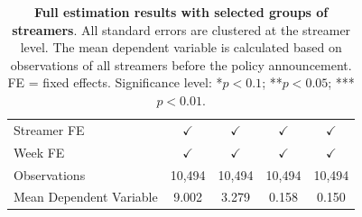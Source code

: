 \documentclass[a4paper,12pt]{article}
\begin{document}
\begin{table}[!htb]
\begin{subtable}{\textwidth}
{\begin{tabular}{lcccc}
Streamer FE & $\checkmark$ & $\checkmark$ & $\checkmark$ & $\checkmark$ \\
Week FE     & $\checkmark$ & $\checkmark$ & $\checkmark$ & $\checkmark$ \\
Observations & 10,494 & 10,494 & 10,494 & 10,494 \\
Mean Dependent Variable & 9.002 & 3.279 & 0.158 & 0.150 \\ 
\hline 
\end{tabular}}
\end{subtable}
\caption{\small \textbf{Full estimation results with selected groups of streamers}. All standard errors are clustered at the streamer level. The mean dependent variable is calculated based on observations of all streamers before the policy announcement. FE = fixed effects. Significance level: *$p<0.1$; **$p<0.05$; ***$p<0.01$.}
\label{table:full-estimation-results-isolated-streamers}
\end{table}

\newpage
\end{document}
